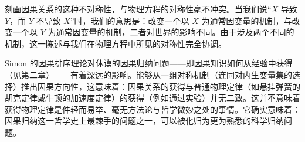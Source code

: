 刻画因果关系的这种不对称性，与物理方程的对称性毫不冲突。当我们说“$X$ 导致 $Y$，而 $Y$ 不导致 $X$”时，我们的意思是：改变一个以 $X$ 为通常因变量的机制，与改变一个以 $Y$ 为通常因变量的机制，二者对世界的影响不同。由于涉及两个不同的机制，这一陈述与我们在物理方程中所见的对称性完全协调。

Simon 的因果排序理论对休谟的因果归纳问题——即因果知识如何从经验中获得（见第二章）——有着深远的影响。能够从一组对称机制（连同对内生变量集的选择）推出因果方向性，这意味着：因果关系的获得与普通物理定律（如悬挂弹簧的胡克定律或牛顿的加速度定律）的获得（例如通过实验）并无二致。这并不意味着获得物理定律是件轻而易举、毫无方法论与哲学微妙之处的事情。它确实意味着：因果归纳这一哲学史上最棘手的问题之一，可以被化归为更为熟悉的科学归纳问题。
